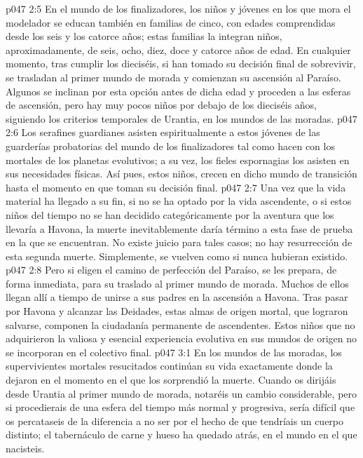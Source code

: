\vs p047 2:5 En el mundo de los finalizadores, los niños y jóvenes en los que mora el modelador se educan también en familias de cinco, con edades comprendidas desde los seis y los catorce años; estas familias la integran niños, aproximadamente, de seis, ocho, diez, doce y catorce años de edad. En cualquier momento, tras cumplir los dieciséis, si han tomado su decisión final de sobrevivir, se trasladan al primer mundo de morada y comienzan su ascensión al Paraíso. Algunos se inclinan por esta opción antes de dicha edad y proceden a las esferas de ascensión, pero hay muy pocos niños por debajo de los dieciséis años, siguiendo los criterios temporales de Urantia, en los mundos de las moradas.
\vs p047 2:6 Los serafines guardianes asisten espiritualmente a estos jóvenes de las guarderías probatorias del mundo de los finalizadores tal como hacen con los mortales de los planetas evolutivos; a su vez, los fieles espornagias los asisten en sus necesidades físicas. Así pues, estos niños, crecen en dicho mundo de transición hasta el momento en que toman su decisión final.
\vs p047 2:7 Una vez que la vida material ha llegado a su fin, si no se ha optado por la vida ascendente, o si estos niños del tiempo no se han decidido categóricamente por la aventura que los llevaría a Havona, la muerte inevitablemente daría término a esta fase de prueba en la que se encuentran. No existe juicio para tales casos; no hay resurrección de esta segunda muerte. Simplemente, se vuelven como si nunca hubieran existido.
\vs p047 2:8 Pero si eligen el camino de perfección del Paraíso, se les prepara, de forma inmediata, para su traslado al primer mundo de morada. Muchos de ellos llegan allí a tiempo de unirse a sus padres en la ascensión a Havona. Tras pasar por Havona y alcanzar las Deidades, estas almas de origen mortal, que lograron salvarse, componen la ciudadanía permanente de ascendentes. Estos niños que no adquirieron la valiosa y esencial experiencia evolutiva en sus mundos de origen no se incorporan en el colectivo final.
\vs p047 3:1 En los mundos de las moradas, los supervivientes mortales resucitados continúan su vida exactamente donde la dejaron en el momento en el que los sorprendió la muerte. Cuando os dirijáis desde Urantia al primer mundo de morada, notaréis un cambio considerable, pero si procedierais de una esfera del tiempo más normal y progresiva, sería difícil que os percataseis de la diferencia a no ser por el hecho de que tendríais un cuerpo distinto; el tabernáculo de carne y hueso ha quedado atrás, en el mundo en el que nacisteis.
